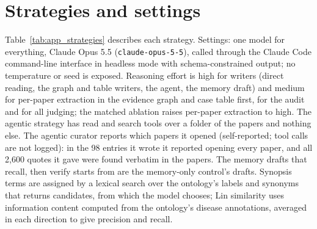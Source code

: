 \documentclass{article} %
\begin{document}
\section{Strategies and settings}
\label{app:settings}
Table~\ref{tab:app_strategies} describes each strategy. Settings: one model for everything, Claude Opus 5.5 (\texttt{claude-opus-5-5}), called through the Claude Code command-line interface in headless mode with schema-constrained output; no temperature or seed is exposed. Reasoning effort is high for writers (direct reading, the graph and table writers, the agent, the memory draft) and medium for per-paper extraction in the evidence graph and case table first, for the audit and for all judging; the matched ablation raises per-paper extraction to high. The agentic strategy has read and search tools over a folder of the papers and nothing else. The agentic curator reports which papers it opened (self-reported; tool calls are not logged): in the 98 entries it wrote it reported opening every paper, and all 2,600 quotes it gave were found verbatim in the papers. The memory drafts that recall, then verify starts from are the memory-only control's drafts. Synopsis terms are assigned by a lexical search over the ontology's labels and synonyms that returns candidates, from which the model chooses; Lin similarity uses information content computed from the ontology's disease annotations, averaged in each direction to give precision and recall.
\end{document}
